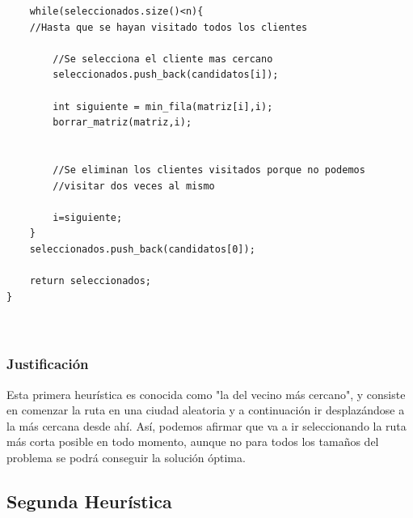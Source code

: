 \documentclass[a4paper,12pt,twoside]{article} %
\begin{document}
\begin{lstlisting}
    while(seleccionados.size()<n){ 
    //Hasta que se hayan visitado todos los clientes

        //Se selecciona el cliente mas cercano
        seleccionados.push_back(candidatos[i]);

        int siguiente = min_fila(matriz[i],i);
        borrar_matriz(matriz,i); 

        
        //Se eliminan los clientes visitados porque no podemos 
        //visitar dos veces al mismo
        
        i=siguiente;
    }
    seleccionados.push_back(candidatos[0]);

    return seleccionados;
}



\end{lstlisting}

\vspace{1cm}
\subsubsection{Justificación}
Esta primera heurística es conocida como "la del vecino más cercano", y consiste en comenzar la ruta en una ciudad aleatoria y a continuación ir desplazándose a la más cercana desde ahí. Así, podemos afirmar que va a ir seleccionando la ruta más corta posible en todo momento, aunque no para todos los tamaños del problema se podrá conseguir la solución óptima.
\newpage


\subsection{Segunda Heurística}
\end{document}
